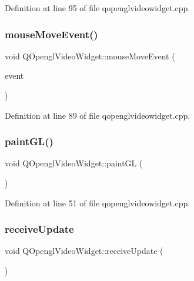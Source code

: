 Definition at line 95 of file qopenglvideowidget.\+cpp.

\mbox{\label{class_q_opengl_video_widget_a3498bcce428d78238d1b101850c0db52}} 
\subsubsection{\texorpdfstring{mouseMoveEvent()}{mouseMoveEvent()}}
{\footnotesize\ttfamily void Q\+Opengl\+Video\+Widget\+::mouse\+Move\+Event (\begin{DoxyParamCaption}\item[{Q\+Mouse\+Event $\ast$}]{event }\end{DoxyParamCaption})\hspace{0.3cm}{\ttfamily [protected]}}



Definition at line 89 of file qopenglvideowidget.\+cpp.

\mbox{\label{class_q_opengl_video_widget_af99c251dee6be9884bf0284156272208}} 
\subsubsection{\texorpdfstring{paintGL()}{paintGL()}}
{\footnotesize\ttfamily void Q\+Opengl\+Video\+Widget\+::paint\+GL (\begin{DoxyParamCaption}{ }\end{DoxyParamCaption})\hspace{0.3cm}{\ttfamily [protected]}}



Definition at line 51 of file qopenglvideowidget.\+cpp.

\mbox{\label{class_q_opengl_video_widget_ae73f50f66112684b2552b6e8496e0e6f}} 
\subsubsection{\texorpdfstring{receiveUpdate}{receiveUpdate}}
{\footnotesize\ttfamily void Q\+Opengl\+Video\+Widget\+::receive\+Update (\begin{DoxyParamCaption}{ }\end{DoxyParamCaption})\hspace{0.3cm}{\ttfamily [slot]}}



